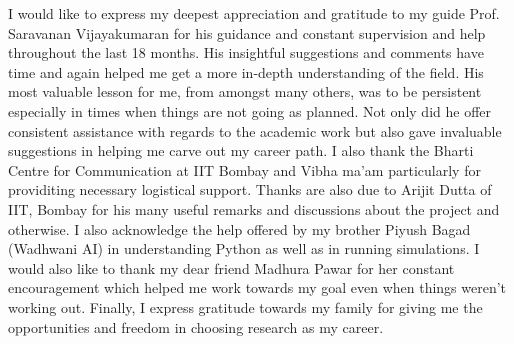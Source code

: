 \acknowledgments

I would like to express my deepest appreciation and gratitude to my guide Prof.
Saravanan Vijayakumaran for his guidance and constant supervision and help throughout the last 18 months. 
His insightful suggestions and comments have time and again helped me get a more in-depth understanding of the field.
His most valuable lesson for me, from amongst many others, was to be persistent especially in times when things are not going as planned. 
Not only did he offer consistent assistance with regards to the academic work but also gave invaluable suggestions in helping me carve out my career path. 
I also thank the Bharti Centre for Communication at IIT Bombay and Vibha ma'am particularly for providiting necessary logistical support.
Thanks are also due to Arijit Dutta of IIT, Bombay for his many useful remarks and discussions about the project and otherwise. 
I also acknowledge the help offered by my brother Piyush Bagad (Wadhwani AI) in understanding Python as well as in running simulations. 
I would also like to thank my dear friend Madhura Pawar for her constant encouragement
which helped me work towards my goal even when things weren't working out.
Finally, I express gratitude towards my family for giving me the opportunities and freedom in choosing research as my career.





\signature{24 June 2020}


